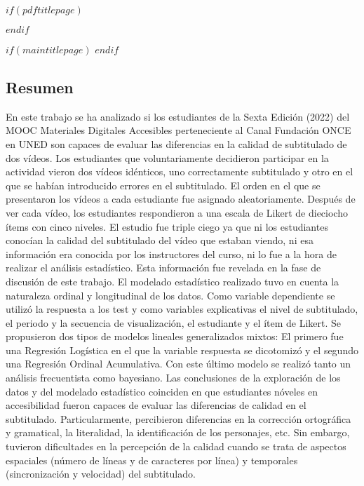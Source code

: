 \frontmatter


$if(pdftitlepage)$

\cleardoublepage
$endif$

$if(maintitlepage)$
$endif$


\makeatletter
\begin{center} %
\chapter*{Resumen} %
\end{center}   
\makeatother
En este trabajo se ha analizado si los estudiantes de la Sexta Edición (2022) del MOOC Materiales Digitales Accesibles
perteneciente al Canal Fundación \nobreak ONCE en UNED son capaces de evaluar las diferencias
en la calidad de subtitulado de dos vídeos. Los estudiantes que voluntariamente decidieron
participar en la actividad vieron dos vídeos idénticos, uno correctamente subtitulado y otro
en el que se habían introducido errores en el subtitulado. El orden en el que se presentaron los vídeos a cada estudiante
fue asignado aleatoriamente. Después de ver cada vídeo, los estudiantes respondieron a una escala de Likert de dieciocho
ítems con cinco niveles. El estudio fue triple ciego ya que ni los estudiantes conocían la calidad
del subtitulado del vídeo que estaban viendo, ni esa información era conocida por los instructores del curso, ni lo fue a la
hora de realizar el análisis estadístico. Esta información fue revelada en la fase de discusión de este trabajo.
El modelado estadístico realizado tuvo en cuenta la naturaleza ordinal y longitudinal de los datos. Como variable dependiente se
utilizó la respuesta a los test y como variables explicativas el nivel de subtitulado, el periodo y la secuencia de visualización,
el estudiante y el ítem de Likert. Se propusieron dos tipos de modelos lineales generalizados mixtos:
El primero fue una Regresión Logística en el que la variable
respuesta se dicotomizó y el segundo una Regresión Ordinal Acumulativa. Con este último modelo se realizó tanto un análisis frecuentista
como bayesiano. Las conclusiones de la exploración de los datos y del modelado estadístico 
coinciden en que estudiantes nóveles en accesibilidad
fueron capaces de evaluar las diferencias de calidad en el subtitulado. Particularmente, percibieron diferencias en la
corrección ortográfica y gramatical, la literalidad, la identificación de los personajes, etc. Sin embargo, tuvieron dificultades en
la percepción de la calidad cuando se trata de aspectos espaciales (número de líneas y de caracteres por línea)
y temporales (sincronización y velocidad) del subtitulado.


